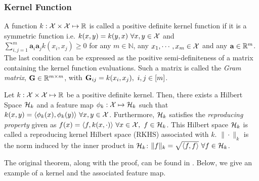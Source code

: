 \subsubsection{Kernel Function} A function $k: \mathcal{X}\times \mathcal{X} \mapsto \mathbb{R}$ is called a positive definite kernel function if it is a symmetric function i.e. $k(x, y) = k(y, x)\ \forall x, y\in \calX$ and $\sum_{i,j=1}^m \mathbf{a}_i\mathbf{a}_j k(x_i, x_j) \geq 0$ for any $m\in \mathbb{N}$, any $x_1, \cdots, x_m \in \mathcal{X}$ and any $\mathbf{a}\in \mathbb{R}^m$. The last condition can be expressed as the positive semi-definiteness of a matrix containing the kernel function evaluations. Such a matrix is called the \textit{Gram matrix}, $\mathbf{G}\in \mathbb{R}^{m\times m}$, with $\mathbf{G}_{ij}=k(x_i, x_j), \ i, j\in [m]$. 

\begin{theorem}
    Let $k:\mathcal{X}\times \mathcal{X}\mapsto \mathbb{R}$ be a positive definite kernel. Then, there exists a Hilbert Space $\mathcal{H}_k$ and a feature map $\phi_k:\mathcal{X} \mapsto \mathcal{H}_k$ such that $k(x, y) = \langle \phi_k(x), \phi_k(y) \rangle \ \forall x, y\in \mathcal{X}$.
    \newline
    Furthermore, $\mathcal{H}_k$ satisfies the \textit{reproducing property} given as $ f(x) = \langle f, k(x, \cdot) \rangle \ \forall x\in \mathcal{X},\ f\in \mathcal{H}_k$.
    \newline
    This Hilbert space $\mathcal{H}_k$ is called a reproducing kernel Hilbert space (RKHS) associated with $k$. $\|\cdot\|_k$ is the norm induced by the inner product in $\mathcal{H}_k$: $\|f\|_k=\sqrt{\langle f, f \rangle}\ \forall f\in \mathcal{H}_k$.
\end{theorem}
The original theorem, along with the proof, can be found in \citet[Theorem (6.8)]{mohri2018foundations}. Below, we give an example of a kernel and the associated feature map.

